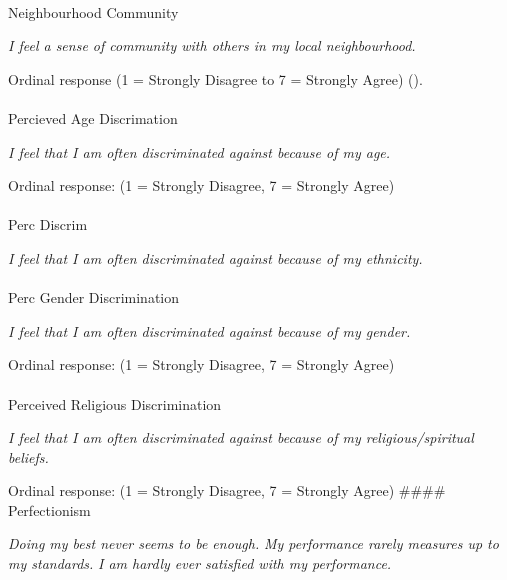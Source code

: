 \documentclass[
  single column]{article}
\makeatletter
\let\oldparagraph\paragraph
\renewcommand{\paragraph}{
    \@ifstar
      \xxxParagraphStar
      \xxxParagraphNoStar
  }
\newcommand{\xxxParagraphStar}[1]{\oldparagraph*{#1}\mbox{}}
\newcommand{\xxxParagraphNoStar}[1]{\oldparagraph{#1}\mbox{}}
\makeatother
\begin{document}
\paragraph{Neighbourhood Community}\label{neighbourhood-community}

\emph{I feel a sense of community with others in my local
neighbourhood.}

Ordinal response (1 = Strongly Disagree to 7 = Strongly Agree)
().

\paragraph{Percieved Age Discrimation}\label{percieved-age-discrimation}

\emph{I feel that I am often discriminated against because of my age.}

Ordinal response: (1 = Strongly Disagree, 7 = Strongly Agree)

\paragraph{Perc Discrim}\label{perc-discrim}

\emph{I feel that I am often discriminated against because of my
ethnicity.}

\paragraph{Perc Gender Discrimination}\label{perc-gender-discrimination}

\emph{I feel that I am often discriminated against because of my
gender.}

Ordinal response: (1 = Strongly Disagree, 7 = Strongly Agree)

\paragraph{Perceived Religious
Discrimination}\label{perceived-religious-discrimination}

\emph{I feel that I am often discriminated against because of my
religious/spiritual beliefs.}

Ordinal response: (1 = Strongly Disagree, 7 = Strongly Agree) \#\#\#\#
Perfectionism

\emph{Doing my best never seems to be enough.} \emph{My performance
rarely measures up to my standards.} \emph{I am hardly ever satisfied
with my performance.}
\end{document}
